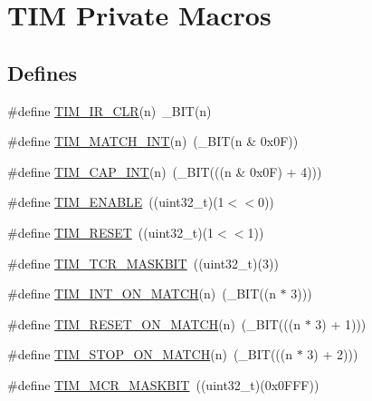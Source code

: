 \hypertarget{group___t_i_m___private___macros}{\section{\-T\-I\-M \-Private \-Macros}
\label{group___t_i_m___private___macros}
}
\subsection*{\-Defines}
\begin{DoxyCompactItemize}
\item 
\#define \hyperlink{group___t_i_m___private___macros_gab61010d9945b0f030be2e504a58e02dd}{\-T\-I\-M\-\_\-\-I\-R\-\_\-\-C\-L\-R}(n)~\-\_\-\-B\-I\-T(n)
\item 
\#define \hyperlink{group___t_i_m___private___macros_ga3f44fee9d01d5ef49bedd4eaa23d35a3}{\-T\-I\-M\-\_\-\-M\-A\-T\-C\-H\-\_\-\-I\-N\-T}(n)~(\-\_\-\-B\-I\-T(n \& 0x0\-F))
\item 
\#define \hyperlink{group___t_i_m___private___macros_ga3663c7124f9d16302efd81fe67d0e83b}{\-T\-I\-M\-\_\-\-C\-A\-P\-\_\-\-I\-N\-T}(n)~(\-\_\-\-B\-I\-T(((n \& 0x0\-F) + 4)))
\item 
\#define \hyperlink{group___t_i_m___private___macros_ga8b50b7a120379d8e0e5badcea7769a59}{\-T\-I\-M\-\_\-\-E\-N\-A\-B\-L\-E}~((uint32\-\_\-t)(1$<$$<$0))
\item 
\#define \hyperlink{group___t_i_m___private___macros_ga46ef76d37c76ad012338f0e869d365dc}{\-T\-I\-M\-\_\-\-R\-E\-S\-E\-T}~((uint32\-\_\-t)(1$<$$<$1))
\item 
\#define \hyperlink{group___t_i_m___private___macros_ga608db4e6a92f068e63e1edb8ae5faad5}{\-T\-I\-M\-\_\-\-T\-C\-R\-\_\-\-M\-A\-S\-K\-B\-I\-T}~((uint32\-\_\-t)(3))
\item 
\#define \hyperlink{group___t_i_m___private___macros_gab40bb819bea0f7602a1c2f0b1657c8f2}{\-T\-I\-M\-\_\-\-I\-N\-T\-\_\-\-O\-N\-\_\-\-M\-A\-T\-C\-H}(n)~(\-\_\-\-B\-I\-T((n $\ast$ 3)))
\item 
\#define \hyperlink{group___t_i_m___private___macros_ga683e291a3b882b8c81fee64ae378d27a}{\-T\-I\-M\-\_\-\-R\-E\-S\-E\-T\-\_\-\-O\-N\-\_\-\-M\-A\-T\-C\-H}(n)~(\-\_\-\-B\-I\-T(((n $\ast$ 3) + 1)))
\item 
\#define \hyperlink{group___t_i_m___private___macros_ga1d43a6ce8dada518d554f0a27bef3a06}{\-T\-I\-M\-\_\-\-S\-T\-O\-P\-\_\-\-O\-N\-\_\-\-M\-A\-T\-C\-H}(n)~(\-\_\-\-B\-I\-T(((n $\ast$ 3) + 2)))
\item 
\#define \hyperlink{group___t_i_m___private___macros_gab8d33d08748164cea166a7198e8cbe20}{\-T\-I\-M\-\_\-\-M\-C\-R\-\_\-\-M\-A\-S\-K\-B\-I\-T}~((uint32\-\_\-t)(0x0\-F\-F\-F))

\end{DoxyCompactItemize}
